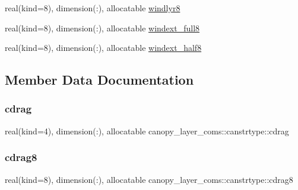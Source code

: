 \begin{DoxyCompactItemize}
\item 
real(kind=8), dimension(\+:), allocatable \hyperlink{structcanopy__layer__coms_1_1canstrtype_ad29af3fcb9a0ed4dc4985eb8f1714283}{windlyr8}
\item 
real(kind=8), dimension(\+:), allocatable \hyperlink{structcanopy__layer__coms_1_1canstrtype_a3181c359a50b42145fcc853de4f37613}{windext\+\_\+full8}
\item 
real(kind=8), dimension(\+:), allocatable \hyperlink{structcanopy__layer__coms_1_1canstrtype_a42b218a7ffe018a0a4f6e753471ff11d}{windext\+\_\+half8}
\end{DoxyCompactItemize}


\subsection{Member Data Documentation}
\mbox{\label{structcanopy__layer__coms_1_1canstrtype_a5ae1b10bcffa38619368cfa76a022c4e}} 
\subsubsection{\texorpdfstring{cdrag}{cdrag}}
{\footnotesize\ttfamily real(kind=4), dimension(\+:), allocatable canopy\+\_\+layer\+\_\+coms\+::canstrtype\+::cdrag}

\mbox{\label{structcanopy__layer__coms_1_1canstrtype_a3a3de790a580c68fd8a4f826c5f3f315}} 
\subsubsection{\texorpdfstring{cdrag8}{cdrag8}}
{\footnotesize\ttfamily real(kind=8), dimension(\+:), allocatable canopy\+\_\+layer\+\_\+coms\+::canstrtype\+::cdrag8}

\mbox{\label{structcanopy__layer__coms_1_1canstrtype_affa32f59db639149948370654c88a4a8}} 
